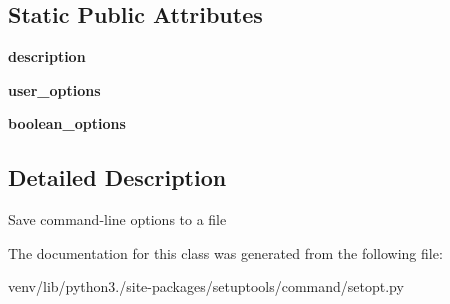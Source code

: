 \subsection*{Static Public Attributes}
\begin{DoxyCompactItemize}
\item 
\mbox{\label{classsetuptools_1_1command_1_1setopt_1_1setopt_a55e0672a40bcd8d74607a78d5cc2a48f}} 
{\bfseries description}
\item 
\mbox{\label{classsetuptools_1_1command_1_1setopt_1_1setopt_af7d52515830d41afde5a8167f64f7d3d}} 
{\bfseries user\+\_\+options}
\item 
\mbox{\label{classsetuptools_1_1command_1_1setopt_1_1setopt_aba096fa53070c99799bf479a166a790d}} 
{\bfseries boolean\+\_\+options}
\end{DoxyCompactItemize}


\subsection{Detailed Description}
\begin{DoxyVerb}Save command-line options to a file\end{DoxyVerb}
 

The documentation for this class was generated from the following file\+:\begin{DoxyCompactItemize}
\item 
venv/lib/python3./site-\/packages/setuptools/command/setopt.\+py\end{DoxyCompactItemize}
